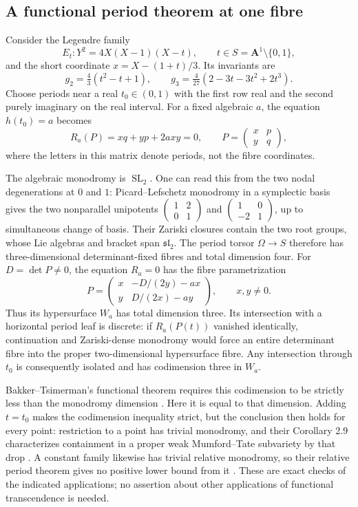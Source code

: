 \documentclass[11pt]{article}
\theoremstyle{definition}\newtheorem{definition}[theorem]{Definition}
\theoremstyle{remark}\newtheorem{remark}[theorem]{Remark}
\DeclareMathOperator{\SL}{SL}\DeclareMathOperator{\End}{End}
\begin{document}
\subsection{A functional period theorem at one fibre}
Consider the Legendre family
\[
 E_t:Y^2=4X(X-1)(X-t),\qquad t\in S=\mathbf A^1\setminus\{0,1\},
\]
and the short coordinate $x=X-(1+t)/3$. Its invariants are
\[
 g_2=\tfrac43(t^2-t+1),\qquad
 g_3=\tfrac4{27}(2-3t-3t^2+2t^3).
\]
Choose periods near a real $t_0\in(0,1)$ with the first row real and the second purely imaginary on the real interval. For a fixed algebraic $a$, the equation $h(t_0)=a$ becomes
\[
 R_a(P)=xq+yp+2axy=0,\qquad
                  P=\begin{pmatrix}x&p\\y&q\end{pmatrix},
\]
where the letters in this matrix denote periods, not the fibre coordinates.

The algebraic monodromy is $\SL_2$. One can read this from the two nodal degenerations at $0$ and $1$: Picard--Lefschetz monodromy in a symplectic basis gives the two nonparallel unipotents
$\left(\begin{smallmatrix}1&2\\0&1\end{smallmatrix}\right)$ and
$\left(\begin{smallmatrix}1&0\\-2&1\end{smallmatrix}\right)$, up to simultaneous change of basis. Their Zariski closures contain the two root groups, whose Lie algebras and bracket span $\mathfrak{sl}_2$.
The period torsor $\Omega\to S$ therefore has three-dimensional determinant-fixed fibres and total dimension four. For $D=\det P\ne0$, the equation $R_a=0$ has the fibre parametrization
\[
 P=\begin{pmatrix}x&-D/(2y)-ax\\y&D/(2x)-ay\end{pmatrix},
                    \qquad x,y\ne0.
\]
Thus its hypersurface $W_a$ has total dimension three. Its intersection with a horizontal period leaf is discrete: if $R_a(P(t))$ vanished identically, continuation and Zariski-dense monodromy would force an entire determinant fibre into the proper two-dimensional hypersurface fibre. Any intersection through $t_0$ is consequently isolated and has codimension three in $W_a$.

Bakker--Tsimerman's functional theorem requires this codimension to be strictly less than the monodromy dimension \cite[Theorem 1.3, p.~5]{BakkerTsimerman}. Here it is equal to that dimension. Adding $t=t_0$ makes the codimension inequality strict, but the conclusion then holds for every point: restriction to a point has trivial monodromy, and their Corollary 2.9 characterizes containment in a proper weak Mumford--Tate subvariety by that drop \cite[p.~8]{BakkerTsimerman}. A constant family likewise has trivial relative monodromy, so their relative period theorem gives no positive lower bound from it \cite[Theorem 4.25, p.~18]{BakkerTsimerman}. These are exact checks of the indicated applications; no assertion about other applications of functional transcendence is needed.
\end{document}
